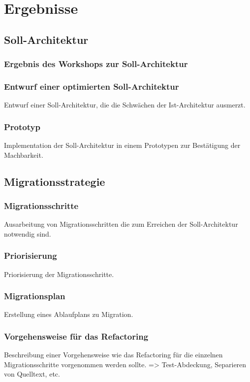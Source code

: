 \chapter{Ergebnisse}



\section{Soll-Architektur}
\subsection{Ergebnis des Workshops zur Soll-Architektur}
% 
\subsection{Entwurf einer optimierten Soll-Architektur}
Entwurf einer Soll-Architektur, die die Schwächen der Ist-Architektur ausmerzt.

\subsection{Prototyp}
Implementation der Soll-Architektur in einem Prototypen zur Bestätigung der Machbarkeit.

\section{Migrationsstrategie}
\subsection{Migrationsschritte}
Ausarbeitung von Migrationsschritten die zum Erreichen der Soll-Architektur notwendig sind.

\subsection{Priorisierung}
Priorisierung der Migrationsschritte.

\subsection{Migrationsplan}
Erstellung eines Ablaufplans zu Migration.

\subsection{Vorgehensweise für das Refactoring}
Beschreibung einer Vorgehensweise wie das Refactoring für die einzelnen Migrationsschritte vorgenommen werden sollte.
=> Test-Abdeckung, Separieren von Quelltext, etc.
